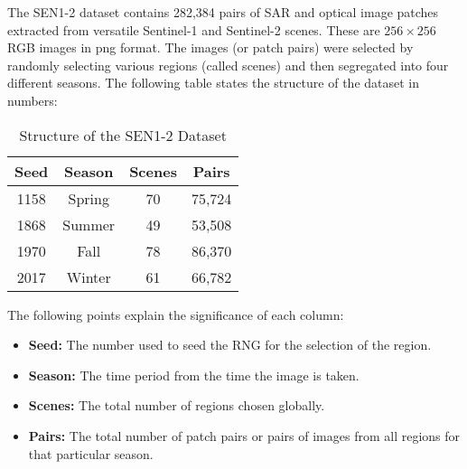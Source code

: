 The SEN1-2 dataset contains 282,384 pairs of SAR and optical image patches extracted from versatile Sentinel-1 and Sentinel-2 scenes. These are $256\times256$ RGB images in png format. The images (or patch pairs) were selected by randomly selecting various regions (called scenes) and then segregated into four different seasons. The following table states the structure of the dataset in numbers:

\begin{table}[h!]
    \begin{center}
        \begin{tabular}{|c|c|c|c|}
            \hline
            Seed & Season & Scenes & Pairs \\
            \hline
            1158 & Spring & 70 & 75,724 \\
            1868 & Summer & 49 & 53,508 \\
            1970 & Fall & 78 & 86,370 \\
            2017 & Winter & 61 & 66,782 \\
            \hline
        \end{tabular}
    \end{center}
    \caption{Structure of the SEN1-2 Dataset}
    \label{table:senStruct}
\end{table}

The following points explain the significance of each column:
\begin{itemize}
    \item \textbf{Seed:} The number used to seed the RNG for the selection of the region.
    \item \textbf{Season:} The time period from the time the image is taken.
    \item \textbf{Scenes:} The total number of regions chosen globally.
    \item \textbf{Pairs:} The total number of patch pairs or pairs of images from all regions for that particular season.
\end{itemize}